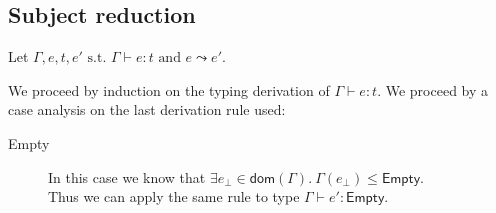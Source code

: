 \documentclass[a4paper]{article}%
\newcommand{\dom}[1]{\textsf{dom}(#1)}
\newcommand{\Empty} {\textsf{Empty}}%
\theoremstyle{definition}
\begin{document}
    \subsection{Subject reduction}

    Let $\Gamma,e,t,e' \text{ s.t. } \Gamma \vdash e : t \text{ and } e \leadsto e'$.

    We proceed by induction on the typing derivation of $\Gamma \vdash e : t$. We proceed by a case analysis on the last derivation rule used:

    \begin{description}
      \item[Empty] In this case we know that $\exists e_{\bot} \in \dom\Gamma.\ \Gamma(e_{\bot}) \leq \Empty$.\\
      Thus we can apply the same rule to type $\Gamma \vdash e' : \Empty$.
    \end{description}
\end{document}
